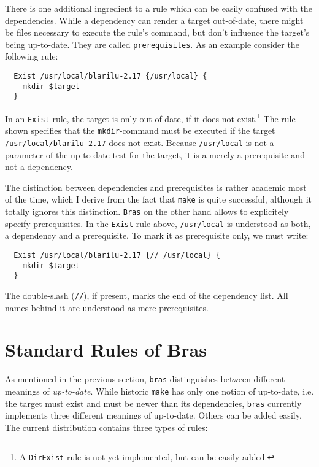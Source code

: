 \documentclass[12pt]{article}
\newcommand{\bras}{\texttt{bras}}
\newcommand{\Bras}{\texttt{Bras}}
\newcommand{\make}{\texttt{make}}
\begin{document}
There is one additional ingredient to a rule which can be easily
confused with the dependencies. While a dependency can render a target
out-of-date, there might be files necessary to execute the rule's
command, but don't influence the target's being up-to-date.
They are called \texttt{prerequisites}. As an example consider the
following rule:

\begin{verbatim}
  Exist /usr/local/blarilu-2.17 {/usr/local} {
    mkdir $target
  }
\end{verbatim}

In an \texttt{Exist}-rule, the target is only out-of-date, if it does
not exist.\footnote{A \texttt{DirExist}-rule is not yet implemented,
but can be easily added.} The rule shown specifies that the
\texttt{mkdir}-command must be executed if the target
\texttt{/usr/local/blarilu-2.17} does not exist.
Because \texttt{/usr/local} is not a
parameter of the up-to-date test for the target, it is a merely a
prerequisite and not a dependency.

The distinction between dependencies and prerequisites is rather
academic most of the time, which I derive from the fact that \make{}
is quite successful, although it totally ignores this
distinction. \Bras{} on the other hand allows to explicitely specify
prerequisites. In the \texttt{Exist}-rule above, \texttt{/usr/local}
is understood as both, a dependency and a prerequisite. To mark it as
prerequisite only, we must write:

\begin{verbatim}
  Exist /usr/local/blarilu-2.17 {// /usr/local} {
    mkdir $target
  }
\end{verbatim}

The double-slash (\texttt{//}), if present, marks the end of the
dependency list. All names behind it are understood as mere
prerequisites. 

\section{Standard Rules of Bras}
\label{SecStandardRules}
As mentioned in the previous section, \bras{} distinguishes between
different meanings of \textit{up-to-date}. While historic
\make{} has only one notion of up-to-date, i.e. the target must exist
and must be newer than its dependencies, \bras{} currently implements
three different meanings of up-to-date. Others can be added
easily. The current distribution contains three types of rules:
\end{document}
